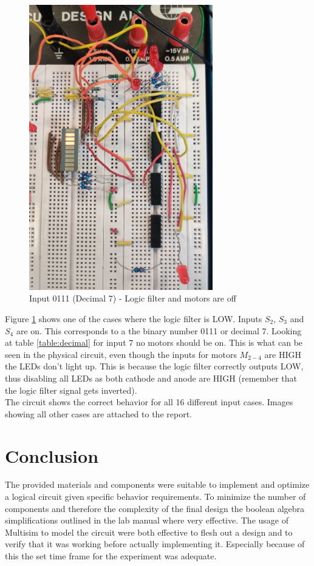 \documentclass[14pt]{article}
\begin{document}
\begin{figure}[H]
  \centering
  \includegraphics[width=8cm]{./images/logic_filter_off.jpg}
  \caption{Input 0111 (Decimal 7) - Logic filter and motors are off}
  \label{fig:circuit_filter_off}
\end{figure}

Figure \ref{fig:circuit_filter_off} shows one of the cases where the logic filter is LOW. Inputs $S_2$, $S_3$ and $S_4$ are on. This corresponds to a the binary number 0111 or decimal 7. Looking
at table \ref{table:decimal} for input 7 no motors should be on. This is what can be seen in the physical circuit, even though the inputs for
motors $M_{2-4}$ are HIGH the LEDs don't light up. This is because the logic filter correctly outputs LOW, thus disabling all LEDs as both
cathode and anode are HIGH (remember that the logic filter signal gets inverted).\\

The circuit shows the correct behavior for all 16 different input cases. Images showing all other cases are attached to the report.

\section{Conclusion}

The provided materials and components were suitable to implement and optimize a logical circuit given specific behavior requirements. To minimize
the number of components and therefore the complexity of the final design the boolean algebra simplifications outlined in the lab manual\autocite{ross} where
very effective. The usage of Multisim to model the circuit were both effective to flesh out a design and to verify that it was working before 
actually implementing it. Especially because of this the set time frame for the experiment was adequate. 

\printbibliography
\end{document}
